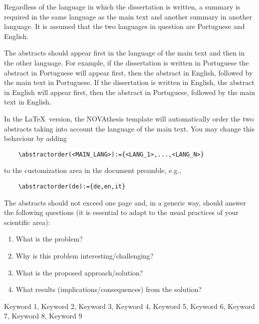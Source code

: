 
%

Regardless of the language in which the dissertation is written, a summary is required in the same language as the main text and another summary in another language. It is assumed that the two languages in question are Portuguese and English.

The abstracts should appear first in the language of the main text and then in the other language. For example, if the dissertation is written in Portuguese the abstract in Portuguese will appear first, then the abstract in English, followed by the main text in Portuguese. If the dissertation is written in English, the abstract in English will appear first, then the abstract in Portuguese, followed by the main text in English. 

In the \LaTeX\ version, the NOVAthesis template will automatically order the two abstracts taking into account the language of the main text. You may change this behaviour by adding
\begin{verbatim}
    \abstractorder(<MAIN_LANG>):={<LANG_1>,...,<LANG_N>}
\end{verbatim}
\noindent to the customization area in the document preamble, e.g.,
\begin{verbatim}
    \abstractorder(de):={de,en,it}
\end{verbatim}

The abstracts should not exceed one page and, in a generic way, should answer the following questions (it is essential to adapt to the usual practices of your scientific area):

\begin{enumerate}
  \item What is the problem?
  \item Why is this problem interesting/challenging?
  \item What is the proposed approach/solution?
  \item What results (implications/consequences) from the solution?
\end{enumerate}

\begin{keywords}
Keyword 1, Keyword 2, Keyword 3, Keyword 4, Keyword 5, Keyword 6, Keyword 7, Keyword 8, Keyword 9
\end{keywords} 
